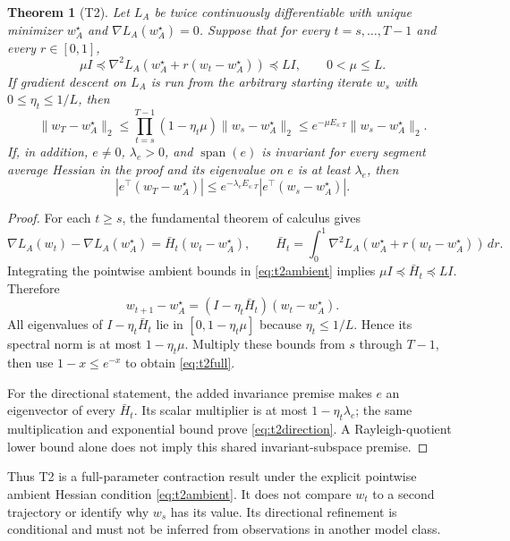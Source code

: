 \documentclass{article}
\newtheorem{theorem}{Theorem}
\begin{document}
\begin{theorem}[T2]
\label{thm:t2}
Let $L_A$ be twice continuously differentiable with unique minimizer
$w_A^\star$ and $\nabla L_A(w_A^\star)=0$. Suppose that for every
$t=s,\ldots,T-1$ and every $r\in[0,1]$,
\begin{equation}
 \mu I\preceq \nabla^2L_A\!\left(w_A^\star+r(w_t-w_A^\star)\right)
 \preceq LI,
 \qquad 0<\mu\leq L.
\label{eq:t2ambient}
\end{equation}
If gradient descent on $L_A$ is run from the arbitrary starting iterate $w_s$
with $0\leq\eta_t\leq1/L$, then
\begin{equation}
 \lVert w_T-w_A^\star\rVert_2
 \leq\prod_{t=s}^{T-1}(1-\eta_t\mu)
      \lVert w_s-w_A^\star\rVert_2
 \leq e^{-\mu E_{s:T}}\lVert w_s-w_A^\star\rVert_2.
\label{eq:t2full}
\end{equation}
If, in addition, $e\ne0$, $\lambda_e>0$, and $\operatorname{span}(e)$ is invariant for every segment
average Hessian in the proof and its eigenvalue on $e$ is at least
$\lambda_e$, then
\begin{equation}
 |e^\top(w_T-w_A^\star)|
 \leq e^{-\lambda_eE_{s:T}}|e^\top(w_s-w_A^\star)|.
\label{eq:t2direction}
\end{equation}
\end{theorem}

\begin{proof}
For each $t\geq s$, the fundamental theorem of calculus gives
\[
 \nabla L_A(w_t)-\nabla L_A(w_A^\star)
 =\bar H_t(w_t-w_A^\star),\qquad
 \bar H_t=\int_0^1\nabla^2L_A(w_A^\star+
        r(w_t-w_A^\star))\,dr .
\]
Integrating the pointwise ambient bounds in \eqref{eq:t2ambient} implies
$\mu I\preceq\bar H_t\preceq LI$. Therefore
\[
 w_{t+1}-w_A^\star=(I-\eta_t\bar H_t)(w_t-w_A^\star).
\]
All eigenvalues of $I-\eta_t\bar H_t$ lie in
$[0,1-\eta_t\mu]$ because $\eta_t\leq1/L$. Hence its spectral norm is at most
$1-\eta_t\mu$. Multiply these bounds from $s$ through $T-1$, then use
$1-x\leq e^{-x}$ to obtain \eqref{eq:t2full}.

For the directional statement, the added invariance premise makes $e$ an
eigenvector of every $\bar H_t$. Its scalar multiplier is at most
$1-\eta_t\lambda_e$; the same multiplication and exponential bound prove
\eqref{eq:t2direction}. A Rayleigh-quotient lower bound alone does not imply
this shared invariant-subspace premise.
\end{proof}

Thus T2 is a full-parameter contraction result under the explicit pointwise
ambient Hessian condition \eqref{eq:t2ambient}. It does not compare $w_t$ to a
second trajectory or identify why $w_s$ has its value. Its directional
refinement is conditional and must not be inferred from observations in another
model class.
\end{document}
